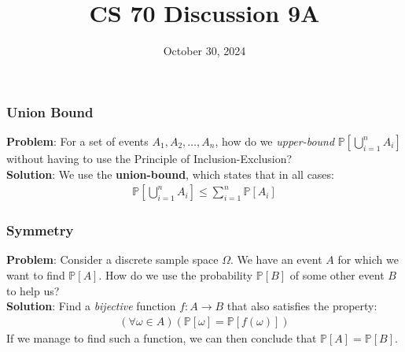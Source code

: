 \documentclass{beamer}
\title{CS 70 Discussion 9A}
\date{October 30, 2024}
\begin{document}
\frame{\titlepage}

\begin{frame}
    \frametitle{Union Bound}
    {\bf Problem}: For a set of events $A_1,A_2,\dots,A_n$, how do we {\it upper-bound} $\mathbb{P}\left[\bigcup_{i=1}^n A_i\right]$ without having to use the Principle of Inclusion-Exclusion?\\
    {\bf Solution}: We use the {\bf union-bound}, which states that in all cases:
    \begin{gather*}
        \mathbb{P}\left[\bigcup_{i=1}^nA_i\right]\leq\sum_{i=1}^n\mathbb{P}[A_i]
    \end{gather*}
\end{frame}

\begin{frame}
    \frametitle{Symmetry}
    {\bf Problem}: Consider a discrete sample space $\Omega$. We have an event $A$ for which we want to find $\mathbb{P}[A]$. How do we use the probability $\mathbb{P}[B]$ of some other event $B$ to help us?\\
    {\bf Solution}: Find a {\it bijective} function $f:A\rightarrow B$ that also satisfies the property:
    \begin{gather*}
        (\forall\omega\in A)(\mathbb{P}[\omega]=\mathbb{P}[f(\omega)])
    \end{gather*}
    If we manage to find such a function, we can then conclude that $\mathbb{P}[A]=\mathbb{P}[B]$.
\end{frame}
\end{document}
